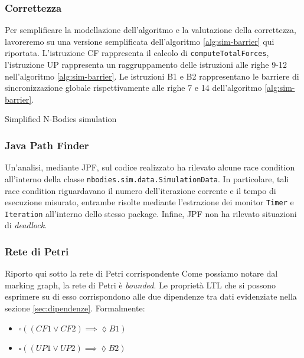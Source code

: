 \documentclass[12pt,a4paper,oneside]{article}
\begin{document}
	\subsubsection{Correttezza}
	\begin{minipage}{.55\textwidth}
		Per semplificare la modellazione dell'algoritmo e la valutazione della correttezza, lavoreremo su una versione semplificata dell'algoritmo \ref{alg:sim-barrier} qui riportata. L'istruzione CF rappresenta il calcolo di \texttt{computeTotalForces}, l'istruzione UP rappresenta un raggruppamento delle istruzioni alle righe 9-12 nell'algoritmo \ref{alg:sim-barrier}. Le istruzioni B1 e B2 rappresentano le barriere di sincronizzazione globale rispettivamente alle righe 7 e 14 dell'algoritmo \ref{alg:sim-barrier}.
	\end{minipage}
	\hfill
	\begin{minipage}{.4\textwidth}
		\begin{algorithm}[H]
			\caption{Simplified N-Bodies simulation}
		\end{algorithm}
	\end{minipage}
	\hfill
	
	\subsubsection{Java Path Finder}
	Un'analisi, mediante JPF, sul codice realizzato ha rilevato alcune race condition all'interno della classe \texttt{nbodies.sim.data.SimulationData}. In particolare, tali race condition riguardavano il numero dell'iterazione corrente e il tempo di esecuzione misurato, entrambe risolte mediante l'estrazione dei monitor \texttt{Timer} e \texttt{Iteration} all'interno dello stesso package. Infine, JPF non ha rilevato situazioni di \textit{deadlock}.
	
	\subsubsection{Rete di Petri}
	Riporto qui sotto la rete di Petri corrispondente
	Come possiamo notare dal marking graph, la rete di Petri è \textit{bounded}. Le proprietà LTL che si possono esprimere su di esso corrispondono alle due dipendenze tra dati evidenziate nella sezione \ref{sec:dipendenze}. Formalmente:
	\begin{itemize}
		\item $\square ((CF1 \vee CF2) \implies \lozenge B1)$
		\item $\square ((UP1 \vee UP2) \implies \lozenge B2)$
	\end{itemize}
\end{document}
